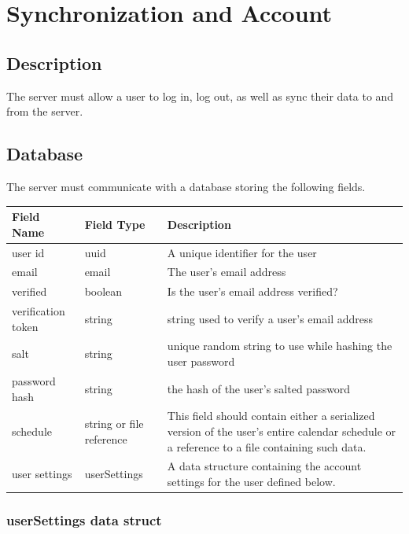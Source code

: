 \documentclass{scrreprt}
\begin{document}
\chapter{Synchronization and Account}

\section{Description}
The server must allow a user to log in, log out, as well as sync their data to and from the server.

\section{Database}
The server must communicate with a database storing the following fields.
\begin{center}
\begin{longtable}{ | p{3cm} | p{4cm} | p{7cm} | }
\hline
\textbf{Field Name} & \textbf{Field Type} & \textbf{Description}\\
\hline
user id & uuid & A unique identifier for the user\\
\hline
email & email & The user's email address\\
\hline
verified & boolean & Is the user's email address verified?\\
\hline
verification token & string & string used to verify a user's email address\\
\hline
salt & string & unique random string to use while hashing the user password\\
\hline
password hash & string & the hash of the user's salted password\\
\hline
schedule & string or file reference & This field should contain either a serialized version of the user's
entire calendar schedule or a reference to a file containing such data.\\
\hline
user settings & userSettings & A data structure containing the account settings for the user defined below.\\
\hline
\end{longtable}
\end{center}

\subsection{userSettings data struct}
\end{document}
